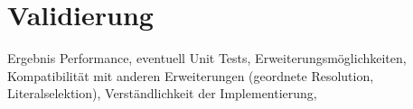 
\chapter{Validierung}

Ergebnis Performance,
eventuell Unit Tests,
Erweiterungsmöglichkeiten,
Kompatibilität mit anderen Erweiterungen (geordnete Resolution, Literalselektion),
Verständlichkeit der Implementierung,